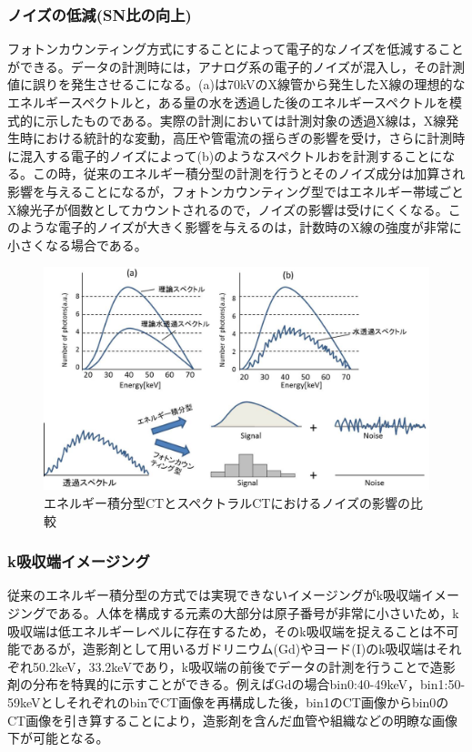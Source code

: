 \subsubsection{ノイズの低減(SN比の向上)}
フォトンカウンティング方式にすることによって電子的なノイズを低減することができる。データの計測時には，アナログ系の電子的ノイズが混入し，その計測値に誤りを発生させるこになる。(a)は70kVのX線管から発生したX線の理想的なエネルギースペクトルと，ある量の水を透過した後のエネルギースペクトルを模式的に示したものである。実際の計測においては計測対象の透過X線は，X線発生時における統計的な変動，高圧や管電流の揺らぎの影響を受け，さらに計測時に混入する電子的ノイズによって(b)のようなスペクトルおを計測することになる。この時，従来のエネルギー積分型の計測を行うとそのノイズ成分は加算され影響を与えることになるが，フォトンカウンティング型ではエネルギー帯域ごとX線光子が個数としてカウントされるので，ノイズの影響は受けにくくなる。このような電子的ノイズが大きく影響を与えるのは，計数時のX線の強度が非常に小さくなる場合である。

\begin{figure}[H]
 \begin{center}
 \includegraphics[width=12cm]{image/other/noise_affect.eps}
 \end{center}
 \caption{エネルギー積分型CTとスペクトラルCTにおけるノイズの影響の比較\cite{ogawa_kaisetu}}
 \label{fig:noise_affect}
\end{figure}

\subsubsection{k吸収端イメージング}
従来のエネルギー積分型の方式では実現できないイメージングがk吸収端イメージングである。人体を構成する元素の大部分は原子番号が非常に小さいため，k吸収端は低エネルギーレベルに存在するため，そのk吸収端を捉えることは不可能であるが，造影剤として用いるガドリニウム(Gd)やヨード(I)のk吸収端はそれぞれ50.2keV，33.2keVであり，k吸収端の前後でデータの計測を行うことで造影剤の分布を特異的に示すことができる。例えばGdの場合bin0:40-49keV，bin1:50-59keVとしそれぞれのbinでCT画像を再構成した後，bin1のCT画像からbin0のCT画像を引き算することにより，造影剤を含んだ血管や組織などの明瞭な画像下が可能となる。

